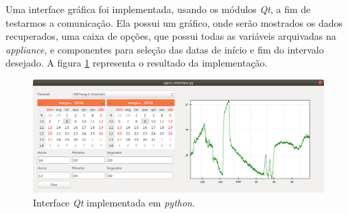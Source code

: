 \vspace{12pt}

Uma interface gráfica foi implementada, usando os módulos \textit{Qt}, a fim de
testarmos a comunicação. Ela possui um gráfico, onde serão mostrados os dados
recuperados, uma caixa de opções, que possui todas as variáveis arquivadas na
\textit{appliance}, e componentes para seleção das datas de início e fim do
intervalo desejado. A figura \ref{fig:interface} representa o resultado da
implementação.

\FloatBarrier

\begin{figure}[h]
    
    \centering
    \includegraphics[scale=0.38]{image/screenshot-python}
    \caption {Interface \textit{Qt} implementada em \textit{python}.}
    \label{fig:interface} 
\end{figure} 

\FloatBarrier
